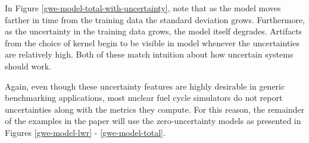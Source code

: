 In Figure \ref{gwe-model-total-with-uncertainty}, note that as the model moves 
farther in time from the training data the standard deviation grows. Furthermore, 
as the uncertainty in the training data grows, the model itself degrades. Artifacts
from the choice of kernel begin to be visible in model whenever the uncertainties are 
relatively high. Both of these match intuition about how uncertain systems should
work.

Again, even though these uncertainty features are highly desirable in 
generic benchmarking applications, most nuclear fuel
cycle simulators do not report uncertainties along with the metrics they compute.
For this reason, the remainder of the examples in the paper will use the 
zero-uncertainty models as presented in Figures \ref{gwe-model-lwr} - 
\ref{gwe-model-total}.


